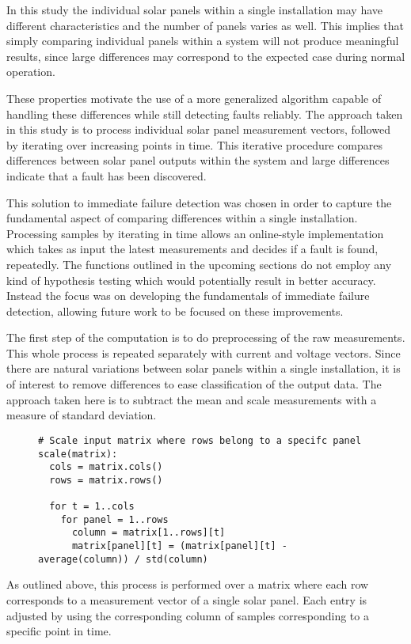 In this study the individual solar panels within a single installation may have different characteristics and the number of panels varies as well.
This implies that simply comparing individual panels within a system will not produce meaningful results, since large differences may correspond to the expected case during normal operation.

These properties motivate the use of a more generalized algorithm capable of handling these differences while still detecting faults reliably.
The approach taken in this study is to process individual solar panel measurement vectors, followed by iterating over increasing points in time.
This iterative procedure compares differences between solar panel outputs within the system and large differences indicate that a fault has been discovered.

This solution to immediate failure detection was chosen in order to capture the fundamental aspect of comparing differences within a single installation.
Processing samples by iterating in time allows an online-style implementation which takes as input the latest measurements and decides if a fault is found, repeatedly.
The functions outlined in the upcoming sections do not employ any kind of hypothesis testing which would potentially result in better accuracy.
Instead the focus was on developing the fundamentals of immediate failure detection, allowing future work to be focused on these improvements.

The first step of the computation is to do preprocessing of the raw measurements.
This whole process is repeated separately with current and voltage vectors.
Since there are natural variations between solar panels within a single installation, it is of interest to remove differences to ease classification of the output data.
The approach taken here is to subtract the mean and scale measurements with a measure of standard deviation.

\begin{figure}[H]
\begin{verbatim}
# Scale input matrix where rows belong to a specifc panel
scale(matrix):
  cols = matrix.cols()
  rows = matrix.rows()

  for t = 1..cols
    for panel = 1..rows
      column = matrix[1..rows][t]
      matrix[panel][t] = (matrix[panel][t] - average(column)) / std(column)
\end{verbatim}
\end{figure}

As outlined above, this process is performed over a matrix where each row corresponds to a measurement vector of a single solar panel.
Each entry is adjusted by using the corresponding column of samples corresponding to a specific point in time.

